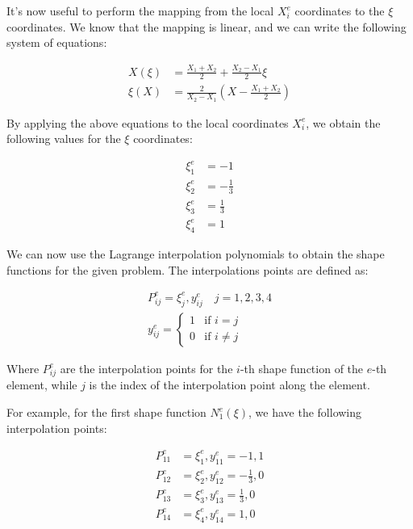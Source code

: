 It's now useful to perform the mapping from the local $X_i^e$ coordinates to the $\xi$ coordinates.
We know that the mapping is linear, and we can write the following system of equations:

\begin{align}
    X(\xi) & = \frac{X_1+X_2}{2} + \frac{X_2-X_1}{2} \xi \\
    \xi(X) & = \frac{2}{X_2-X_1} (X - \frac{X_1+X_2}{2})
\end{align}

By applying the above equations to the local coordinates $X_i^e$, we obtain the following values for the $\xi$ coordinates:

\begin{align}
    \xi_1^e & = -1           \\
    \xi_2^e & = -\frac{1}{3} \\
    \xi_3^e & = \frac{1}{3}  \\
    \xi_4^e & = 1
\end{align}

We can now use the Lagrange interpolation polynomials to obtain the shape functions for the given problem.
The interpolations points are defined as:

\begin{align}
    P_{ij}^e = {\xi_j^e, y_{ij}^e} \quad j = 1, 2, 3, 4 \\
    y_{ij}^e = \begin{cases}
                   1 & \text{if } i = j    \\
                   0 & \text{if } i \neq j
               \end{cases}
\end{align}

Where $P_{ij}^e$ are the interpolation points for the $i$-th shape function of the $e$-th element, while $j$ is the index of the interpolation point along the element.

For example, for the first shape function $N_1^e(\xi)$, we have the following interpolation points:

\begin{align}
    P_{11}^e & = {\xi_1^e, y_{11}^e} = {-1, 1}           \\
    P_{12}^e & = {\xi_2^e, y_{12}^e} = {-\frac{1}{3}, 0} \\
    P_{13}^e & = {\xi_3^e, y_{13}^e} = {\frac{1}{3}, 0}  \\
    P_{14}^e & = {\xi_4^e, y_{14}^e} = {1, 0}
\end{align}

